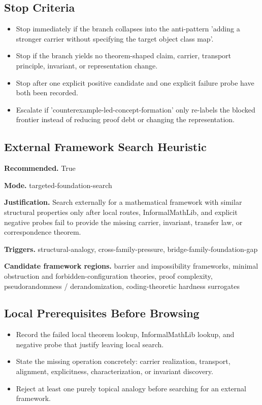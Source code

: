 \documentclass[11pt]{article}
\begin{document}
\subsection*{Stop Criteria}
\begin{itemize}[leftmargin=*,itemsep=0.2em]
\item Stop immediately if the branch collapses into the anti-pattern 'adding a stronger carrier without specifying the target object class map'.
\item Stop if the branch yields no theorem-shaped claim, carrier, transport principle, invariant, or representation change.
\item Stop after one explicit positive candidate and one explicit failure probe have both been recorded.
\item Escalate if 'counterexample-led-concept-formation' only re-labels the blocked frontier instead of reducing proof debt or changing the representation.
\end{itemize}
\subsection*{External Framework Search Heuristic}
\textbf{Recommended.} True

\textbf{Mode.} targeted-foundation-search

\textbf{Justification.} Search externally for a mathematical framework with similar structural properties only after local routes, InformalMathLib, and explicit negative probes fail to provide the missing carrier, invariant, transfer law, or correspondence theorem.

\textbf{Triggers.} structural-analogy, cross-family-pressure, bridge-family-foundation-gap

\textbf{Candidate framework regions.} barrier and impossibility frameworks, minimal obstruction and forbidden-configuration theories, proof complexity, pseudorandomness / derandomization, coding-theoretic hardness surrogates

\subsection*{Local Prerequisites Before Browsing}
\begin{itemize}[leftmargin=*,itemsep=0.2em]
\item Record the failed local theorem lookup, InformalMathLib lookup, and negative probe that justify leaving local search.
\item State the missing operation concretely: carrier realization, transport, alignment, explicitness, characterization, or invariant discovery.
\item Reject at least one purely topical analogy before searching for an external framework.
\end{itemize}
\end{document}
